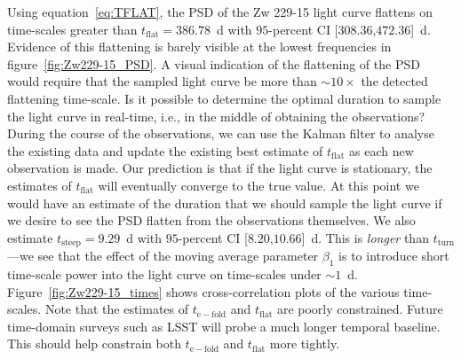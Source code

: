 \documentclass[a4paper,fleqn,usenatbib]{mnras}
\begin{document}
Using equation~\eqref{eq:TFLAT}, the PSD of the Zw 229-15 light curve flattens on time-scales greater than $t_{\mathrm{flat}} = 386.78$~d with $95$-percent CI [$308.36$,$472.36$]~d. Evidence of this flattening is barely visible at the lowest frequencies in figure~\ref{fig:Zw229-15_PSD}. A visual indication of the flattening of the PSD would require that the sampled light curve be more than $\sim 10 \times$ the detected flattening time-scale. Is it possible to determine the optimal duration to sample the light curve in real-time, i.e., in the middle of obtaining the observations? During the course of the observations, we can use the Kalman filter to analyse the existing data and update the existing best estimate of  $t_{\mathrm{flat}}$ as each new observation is made. Our prediction is that if the light curve is stationary, the estimates of $t_{\mathrm{flat}}$ will eventually converge to the true value. At this point we would have an estimate of the duration that we should sample the light curve if we desire to see the PSD flatten from the observations themselves. We also estimate $t_{\mathrm{steep}} = 9.29$~d with $95$-percent CI [$8.20$,$10.66$]~d. This is \textit{longer} than $t_{\mathrm{turn}}$---we see that the effect of the moving average parameter $\beta_{1}$ is to introduce short time-scale power into the light curve on time-scales under $\sim 1$~d. Figure~\ref{fig:Zw229-15_times} shows cross-correlation plots of the various time-scales. Note that the estimates of $t_\mathrm{e-fold}$ and $t_{\mathrm{flat}}$ are poorly constrained. Future time-domain surveys such as LSST will probe a much longer temporal baseline. This should help constrain both $t_{\mathrm{e-fold}}$ and $t_{\mathrm{flat}}$ more tightly.


\end{document}

